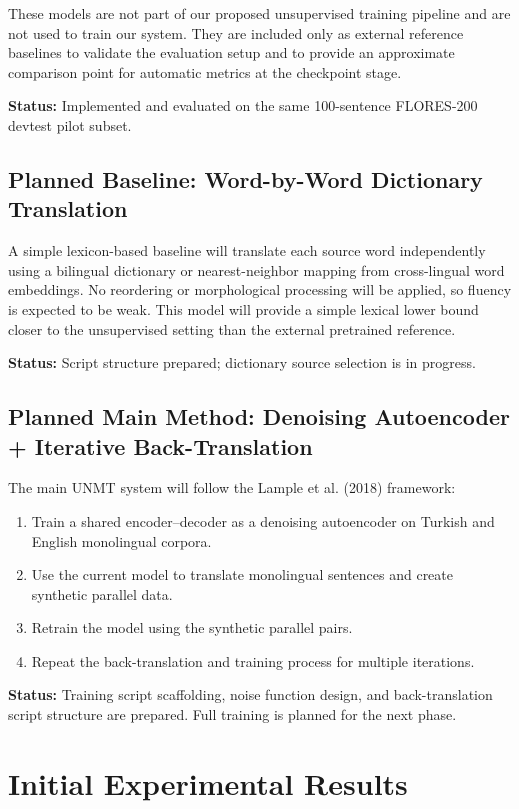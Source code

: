\documentclass[11pt]{article}
\begin{document}
These models are not part of our proposed unsupervised training pipeline and are not used to train our system. They are included only as external reference baselines to validate the evaluation setup and to provide an approximate comparison point for automatic metrics at the checkpoint stage.

\textbf{Status:} Implemented and evaluated on the same 100-sentence FLORES-200 devtest pilot subset.

\subsection{Planned Baseline: Word-by-Word Dictionary Translation}

A simple lexicon-based baseline will translate each source word independently using a bilingual dictionary or nearest-neighbor mapping from cross-lingual word embeddings. No reordering or morphological processing will be applied, so fluency is expected to be weak. This model will provide a simple lexical lower bound closer to the unsupervised setting than the external pretrained reference.

\textbf{Status:} Script structure prepared; dictionary source selection is in progress.

\subsection{Planned Main Method: Denoising Autoencoder + Iterative Back-Translation}

The main UNMT system will follow the Lample et al. (2018) framework:
\begin{enumerate}
    \item Train a shared encoder--decoder as a denoising autoencoder on Turkish and English monolingual corpora.
    \item Use the current model to translate monolingual sentences and create synthetic parallel data.
    \item Retrain the model using the synthetic parallel pairs.
    \item Repeat the back-translation and training process for multiple iterations.
\end{enumerate}

\textbf{Status:} Training script scaffolding, noise function design, and back-translation script structure are prepared. Full training is planned for the next phase.

\section{Initial Experimental Results}
\end{document}
